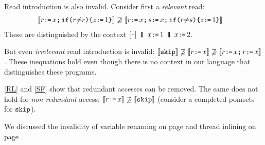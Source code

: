 Read introduction is also invalid.  Consider first a \emph{relevant} read:
\begin{align*}
  \sem{\aReg \GETS \aLoc \SEMI \IF{\aReg {\neq} \aReg} \THEN \cLoc \GETS 1 \FI}
  &\not\supseteq
  \sem{\aReg \GETS \aLoc \SEMI \bReg \GETS \aLoc  \SEMI \IF{\aReg {\neq}\bReg} \THEN \cLoc \GETS 1 \FI}
\end{align*}
These are distinguished by the context
\begin{math}
  \hole{} \PAR x\GETS1\PAR x\GETS2.
\end{math}

But even \emph{irrelevant} read introduction is invalid:
$\sem{\SKIP}\not\supseteq\sem{r\GETS x}\not\supseteq\sem{r\GETS x\SEMI r\GETS x}$.  These inequations hold even though there is no context in our
language that distinguishes these programs.

\ref{RL} and \ref{SF} show that redundant accesses can be removed.  The same
does not hold for \emph{non-redundant} access:
$\sem{r\GETS x}\not\supseteq\sem{\SKIP}$ (consider a completed pomsets for
$\SKIP$).


We discussed the invalidity of variable renaming on page
\pageref{page:extrusion} and thread inlining on page
\pageref{page:inlining}.







